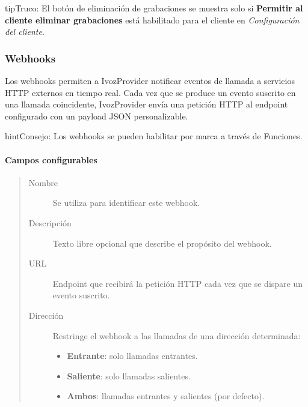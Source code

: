 \documentclass[letterpaper,10pt,spanish]{sphinxmanual}
\begin{document}
\begin{notice}{tip}{Truco:}
El botón de eliminación de grabaciones se muestra solo si \textbf{Permitir al cliente eliminar grabaciones} está habilitado para el cliente en \emph{Configuración del cliente}.
\end{notice}


\subsubsection{Webhooks}
\label{administration_portal/client/vpbx/calls/webhooks:vpbx-webhooks}\label{administration_portal/client/vpbx/calls/webhooks::doc}\label{administration_portal/client/vpbx/calls/webhooks:webhooks}
Los webhooks permiten a IvozProvider notificar eventos de llamada a servicios HTTP externos en tiempo real. Cada vez que se produce un evento suscrito en una llamada coincidente, IvozProvider envía una petición HTTP  al endpoint configurado con un payload JSON personalizable.

\begin{notice}{hint}{Consejo:}
Los webhooks se pueden habilitar por marca a través de Funciones.
\end{notice}


\paragraph{Campos configurables}
\label{administration_portal/client/vpbx/calls/webhooks:configurable-fields}\begin{quote}
\begin{description}
\item[{Nombre}] \leavevmode
Se utiliza para identificar este webhook.

\item[{Descripción}] \leavevmode
Texto libre opcional que describe el propósito del webhook.

\item[{URL}] \leavevmode
Endpoint que recibirá la petición HTTP  cada vez que se dispare un evento suscrito.

\item[{Dirección}] \leavevmode
Restringe el webhook a las llamadas de una dirección determinada:
\begin{itemize}
\item {} 
\textbf{Entrante}: solo llamadas entrantes.

\item {} 
\textbf{Saliente}: solo llamadas salientes.

\item {} 
\textbf{Ambos}: llamadas entrantes y salientes (por defecto).

\end{itemize}

\end{description}
\end{quote}
\end{document}
